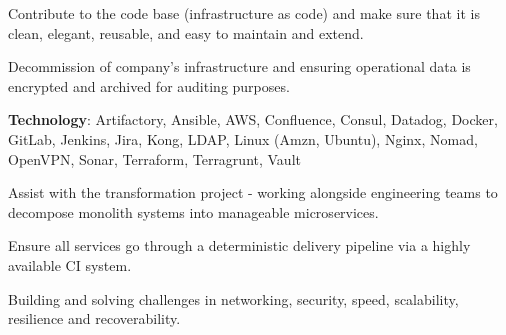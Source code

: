 \documentclass[]{cv}
\begin{document}
\begin{minipage}[t]{0.70\textwidth}
\begin{tightemize}
\item Contribute to the code base (infrastructure as code) and make sure that it is clean, elegant, reusable, and easy to maintain and extend.
\item Decommission of company's infrastructure and ensuring operational data is encrypted and archived for auditing purposes.
\end{tightemize}
\sectionsep
\sectionsep
{}
\sectionsep
\textbf{Technology}: Artifactory, Ansible, AWS, Confluence, Consul, Datadog, Docker, GitLab, Jenkins, Jira, Kong, LDAP, Linux (Amzn, Ubuntu), Nginx, Nomad, OpenVPN, Sonar, Terraform, Terragrunt, Vault
\sectionsep
\begin{tightemize}
\item Assist with the transformation project - working alongside engineering teams to decompose monolith systems into manageable microservices.
\item Ensure all services go through a deterministic delivery pipeline via a highly available CI system.
\item Building and solving challenges in networking, security, speed, scalability, resilience and recoverability.
\end{tightemize}
\sectionsep

\end{minipage}
\hfill
\end{document}
